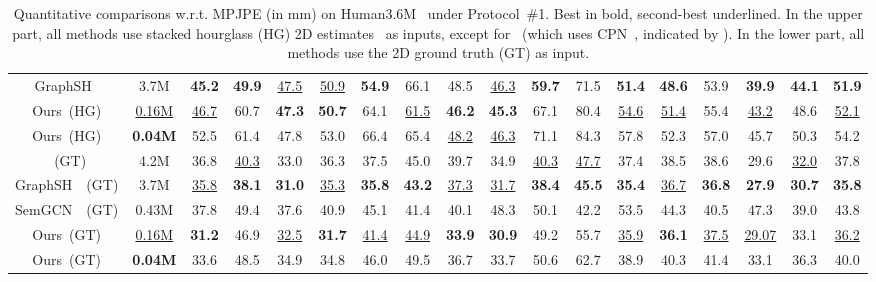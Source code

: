 \documentclass[runningheads]{llncs}
\begin{document}
\begin{table*}
{\begin{tabular}{c| c c c c c c c c c c c c c c c c c}
  GraphSH~\cite{xu2021graph}\hypersetup{citecolor=black}  & 3.7M & \textbf{45.2} & \textbf{49.9} & \underline{47.5} & \underline{50.9} & \textbf{54.9} & 66.1 & 48.5 & \underline{46.3} & \textbf{59.7} &\phantom{0}71.5 & \textbf{51.4} & \textbf{48.6} & 53.9 & \textbf{39.9} & \textbf{44.1} & \textbf{51.9} \\ 
 Ours~(HG) & \underline{0.16M} & \underline{46.7} & 60.7 & \textbf{47.3} &\textbf{50.7} &64.1  &\underline{61.5} &\textbf{46.2}  &\textbf{45.3}  &67.1 &\phantom{0}80.4 & \underline{54.6} & \underline{51.4} & 55.4 & \underline{43.2} & 48.6 & \underline{52.1}  \\
 Ours~(HG) & \textbf{0.04M} &52.5& 61.4 & 47.8 & 53.0& 66.4 &65.4 & \underline{48.2} & \underline{46.3}  & 71.1& \phantom{0}84.3 & 57.8 & 52.3 & 57.0 & 45.7 &50.3  & 54.2  \\
 \hline
   \citet{liu2020comprehensive}~(GT) & 4.2M & 36.8 & \underline{40.3} & 33.0 & 36.3 & 37.5 & 45.0 & 39.7 & 34.9 & \underline{40.3} & \phantom{0}\underline{47.7} & 37.4 & 38.5 & 38.6 & 29.6 & \underline{32.0} & 37.8  \\ 
  GraphSH~\cite{xu2021graph}~(GT) & 3.7M & \underline{35.8} & \textbf{38.1} & \textbf{31.0} & \underline{35.3} & \textbf{35.8} & \textbf{43.2} & \underline{37.3} & \underline{31.7} & \textbf{38.4} & \phantom{0}\textbf{45.5} & \textbf{35.4} & \underline{36.7} & \textbf{36.8} & \textbf{27.9} & \textbf{30.7} & \textbf{35.8}  \\
    SemGCN~\cite{zhaoCVPR19semantic}~(GT) & 0.43M & 37.8 & 49.4 & 37.6 & 40.9 & 45.1 & 41.4 & 40.1 & 48.3 & 50.1 & \phantom{0}42.2 & 53.5 & 44.3 & 40.5 & 47.3 & 39.0 & 43.8  \\
 Ours~(GT) & \underline{0.16M} & \textbf{31.2} & 46.9 & \underline{32.5} & \textbf{31.7} & \underline{41.4} & \underline{44.9} & \textbf{33.9} & \textbf{30.9}& 49.2 & \phantom{0}55.7 &\underline{35.9} &\textbf{36.1} & \underline{37.5} &  \underline{29.07} & 33.1& \underline{36.2}  \\ 
 Ours~(GT) & \textbf{0.04M} & 33.6 & 48.5  & 34.9 &34.8 & 46.0 & 49.5 & 36.7 & 33.7 & 50.6 & \phantom{0}62.7 & 38.9 & 40.3 & 41.4 & 33.1 & 36.3 & 40.0 \\ 
\hline
 \end{tabular}
 }

 \caption{
 Quantitative comparisons w.r.t. MPJPE (in mm) on Human3.6M~\cite{h36m_pami} under Protocol~\#1. Best in bold, second-best underlined.
 In the upper part, all methods use stacked hourglass (HG) 2D estimates~\cite{newell2016stacked} as inputs, except for~\cite{xu2021graph} (which uses CPN~\cite{Chen_2018_CVPR}, indicated by ).
 In the lower part, all methods use the 2D ground truth (GT) as input.
 }
 \label{protocol1}
\end{table*}
\vspace{-30px}
\end{document}
